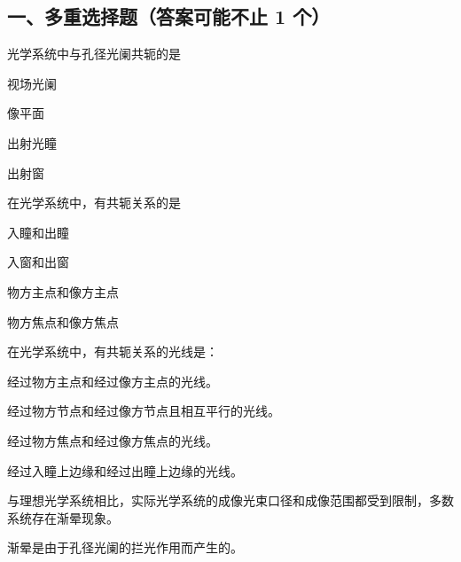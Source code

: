 \documentclass[standard, analysis, notocnum]{ExBook}
\newcommand{\answerarea}[1][8cm]{%
  \par\vspace{2mm}%
  \noindent{\color{themeColor!35}\rule{\linewidth}{0.4pt}}\par
  \noindent\begin{minipage}[t][#1][t]{\linewidth}\vspace{0pt}\end{minipage}\par
  \noindent{\color{themeColor!35}\rule{\linewidth}{0.4pt}}\par
}
\begin{document}
\subsection{一、多重选择题（答案可能不止 1 个）}
\begin{qitems}
\begin{bbox}
\qitem 光学系统中与孔径光阑共轭的是
\par\noindent\hspace{2em}视场光阑
\par\noindent\hspace{2em}像平面
\par\noindent\hspace{2em}出射光瞳
\par\noindent\hspace{2em}出射窗
\answerarea[3.5cm]
\end{bbox}
\begin{bbox}
\qitem 在光学系统中，有共轭关系的是
\par\noindent\hspace{2em}入瞳和出瞳
\par\noindent\hspace{2em}入窗和出窗
\par\noindent\hspace{2em}物方主点和像方主点
\par\noindent\hspace{2em}物方焦点和像方焦点
\answerarea[3.5cm]
\end{bbox}
\begin{bbox}
\qitem 在光学系统中，有共轭关系的光线是：
\par\noindent\hspace{2em}经过物方主点和经过像方主点的光线。
\par\noindent\hspace{2em}经过物方节点和经过像方节点且相互平行的光线。
\par\noindent\hspace{2em}经过物方焦点和经过像方焦点的光线。
\par\noindent\hspace{2em}经过入瞳上边缘和经过出瞳上边缘的光线。
\answerarea[3.5cm]
\end{bbox}
\begin{bbox}
\qitem 与理想光学系统相比，实际光学系统的成像光束口径和成像范围都受到限制，多数系统存在渐晕现象。
\par\noindent\hspace{2em}渐晕是由于孔径光阑的拦光作用而产生的。

\end{bbox}
\end{qitems}
\end{document}
